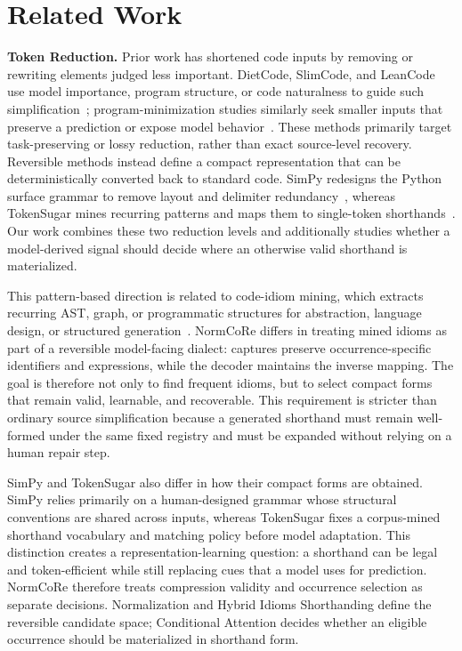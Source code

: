 
\section{Related Work}
\label{sec:related}


\textbf{Token Reduction.} Prior work has shortened code inputs by removing or rewriting elements judged less important. DietCode, SlimCode, and LeanCode use model importance, program structure, or code naturalness to guide such simplification~\cite{dietcode2022,slimcode2024,leancode2025}; program-minimization studies similarly seek smaller inputs that preserve a prediction or expose model behavior~\cite{p2im2021,rabin2021,rabin2022}. These methods primarily target task-preserving or lossy reduction, rather than exact source-level recovery. Reversible methods instead define a compact representation that can be deterministically converted back to standard code. SimPy redesigns the Python surface grammar to remove layout and delimiter redundancy~\cite{simpy2024}, whereas TokenSugar mines recurring patterns and maps them to single-token shorthands~\cite{tokensugar2024}. Our work combines these two reduction levels and additionally studies whether a model-derived signal should decide where an otherwise valid shorthand is materialized.

This pattern-based direction is related to code-idiom mining, which extracts recurring AST, graph, or programmatic structures for abstraction, language design, or structured generation~\cite{allamanis2014,allamanis2018mining,sivaraman2022,iyer2019,shin2019}. NormCoRe differs in treating mined idioms as part of a reversible model-facing dialect: captures preserve occurrence-specific identifiers and expressions, while the decoder maintains the inverse mapping. The goal is therefore not only to find frequent idioms, but to select compact forms that remain valid, learnable, and recoverable.
This requirement is stricter than ordinary source simplification because a generated shorthand must remain well-formed under the same fixed registry and must be expanded without relying on a human repair step.

SimPy and TokenSugar also differ in how their compact forms are obtained. SimPy relies primarily on a human-designed grammar whose structural conventions are shared across inputs, whereas TokenSugar fixes a corpus-mined shorthand vocabulary and matching policy before model adaptation. This distinction creates a representation-learning question: a shorthand can be legal and token-efficient while still replacing cues that a model uses for prediction. NormCoRe therefore treats compression validity and occurrence selection as separate decisions. Normalization and Hybrid Idioms Shorthanding define the reversible candidate space; Conditional Attention decides whether an eligible occurrence should be materialized in shorthand form.

